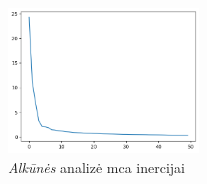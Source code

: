 \begin{figure}[h]
    \centering
    \includegraphics[width=0.45\textwidth]{images/inertia_50.png}
    \caption{\textit{Alkūnės} analizė \gls{mca} inercijai}
    \label{fig:inertia}
\end{figure}

